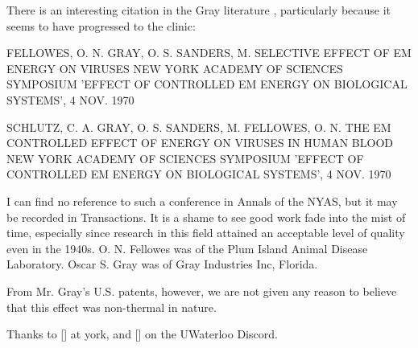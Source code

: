 \documentclass[paper.tex]{subfiles}
\begin{document}
There is an interesting citation in the Gray literature \cite{Indexa}, particularly because it seems to have progressed to the clinic:

FELLOWES, O. N. GRAY, O. S. SANDERS, M. SELECTIVE EFFECT OF EM ENERGY ON VIRUSES 
NEW YORK ACADEMY OF SCIENCES SYMPOSIUM 'EFFECT OF CONTROLLED EM ENERGY ON BIOLOGICAL SYSTEMS', 4 NOV. 1970

SCHLUTZ, C. A. GRAY, O. S. SANDERS, M. FELLOWES, O. N. 
THE EM CONTROLLED EFFECT OF ENERGY ON VIRUSES IN HUMAN BLOOD NEW YORK ACADEMY OF SCIENCES SYMPOSIUM 'EFFECT OF CONTROLLED EM ENERGY ON BIOLOGICAL SYSTEMS', 4 NOV. 1970

I can find no reference to such a conference in Annals of the NYAS, but it may be recorded in Transactions. It is a shame to see good work fade into the mist of time, especially since research in this field attained an acceptable level of quality even in the 1940s. O. N. Fellowes was of the Plum Island Animal Disease Laboratory. Oscar S. Gray was of Gray Industries Inc, Florida. 

From Mr. Gray's U.S. patents, however, we are not given any reason to believe that this effect was non-thermal in nature.

Thanks to [] at york, and [] on the UWaterloo Discord.
\end{document}

